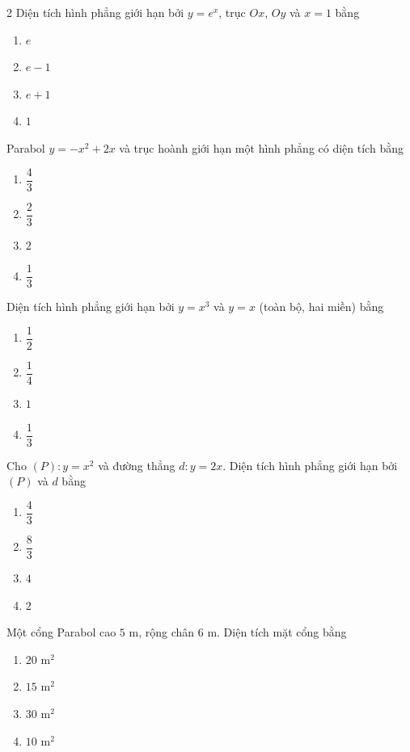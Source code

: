 \begin{multicols}{2}
\cauhoi Diện tích hình phẳng giới hạn bởi $y=e^x$, trục $Ox$, $Oy$ và $x=1$ bằng
\begin{enumerate}[label=\textbf{\Alph*.}, leftmargin=0.9cm]
  \item $e$
  \item $e-1$
  \item $e+1$
  \item $1$
\end{enumerate}

\cauhoi Parabol $y=-x^2+2x$ và trục hoành giới hạn một hình phẳng có diện tích bằng
\begin{enumerate}[label=\textbf{\Alph*.}, leftmargin=0.9cm]
  \item $\dfrac{4}{3}$
  \item $\dfrac{2}{3}$
  \item $2$
  \item $\dfrac{1}{3}$
\end{enumerate}

\cauhoi Diện tích hình phẳng giới hạn bởi $y=x^3$ và $y=x$ (toàn bộ, hai miền) bằng
\begin{enumerate}[label=\textbf{\Alph*.}, leftmargin=0.9cm]
  \item $\dfrac12$
  \item $\dfrac14$
  \item $1$
  \item $\dfrac13$
\end{enumerate}

\cauhoi Cho $(P):y=x^2$ và đường thẳng $d:y=2x$. Diện tích hình phẳng giới hạn bởi $(P)$ và $d$ bằng
\begin{enumerate}[label=\textbf{\Alph*.}, leftmargin=0.9cm]
  \item $\dfrac43$
  \item $\dfrac83$
  \item $4$
  \item $2$
\end{enumerate}

\cauhoi Một cổng Parabol cao $5$ m, rộng chân $6$ m. Diện tích mặt cổng bằng
\begin{enumerate}[label=\textbf{\Alph*.}, leftmargin=0.9cm]
  \item $20$ m$^2$
  \item $15$ m$^2$
  \item $30$ m$^2$
  \item $10$ m$^2$
\end{enumerate}
\end{multicols}

